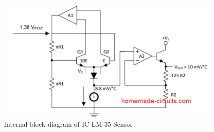 \begin{figure}
    \centering
    \includegraphics[width=0.5\linewidth]{images/lm-35.png}
    \caption{Internal block diagram of IC LM-35 Sensor \cite{38}}
    \label{fig:lm-35-sensor}
\end{figure}
